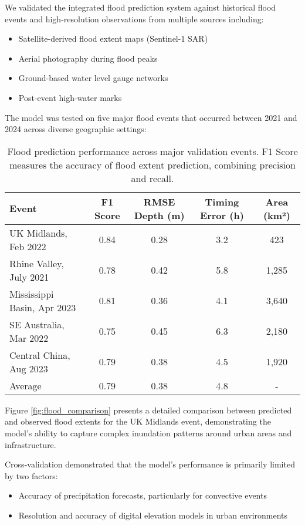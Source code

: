 \documentclass{article}
\begin{document}
We validated the integrated flood prediction system against historical flood events and high-resolution observations from multiple sources including:

\begin{itemize}
    \item Satellite-derived flood extent maps (Sentinel-1 SAR)
    \item Aerial photography during flood peaks
    \item Ground-based water level gauge networks
    \item Post-event high-water marks
\end{itemize}

The model was tested on five major flood events that occurred between 2021 and 2024 across diverse geographic settings:

\begin{table}[h]
    \centering
    \begin{tabular}{l|c|c|c|c}
        \hline
        \textbf{Event} & \textbf{F1 Score} & \textbf{RMSE Depth (m)} & \textbf{Timing Error (h)} & \textbf{Area (km²)} \\
        \hline
        UK Midlands, Feb 2022 & 0.84 & 0.28 & 3.2 & 423 \\
        Rhine Valley, July 2021 & 0.78 & 0.42 & 5.8 & 1,285 \\
        Mississippi Basin, Apr 2023 & 0.81 & 0.36 & 4.1 & 3,640 \\
        SE Australia, Mar 2022 & 0.75 & 0.45 & 6.3 & 2,180 \\
        Central China, Aug 2023 & 0.79 & 0.38 & 4.5 & 1,920 \\
        \hline
        Average & 0.79 & 0.38 & 4.8 & - \\
        \hline
    \end{tabular}
    \caption{Flood prediction performance across major validation events. F1 Score measures the accuracy of flood extent prediction, combining precision and recall.}
    \label{tab:flood_validation}
\end{table}

Figure \ref{fig:flood_comparison} presents a detailed comparison between predicted and observed flood extents for the UK Midlands event, demonstrating the model's ability to capture complex inundation patterns around urban areas and infrastructure.

Cross-validation demonstrated that the model's performance is primarily limited by two factors:
\begin{itemize}
    \item Accuracy of precipitation forecasts, particularly for convective events
    \item Resolution and accuracy of digital elevation models in urban environments
\end{itemize}
\end{document}
